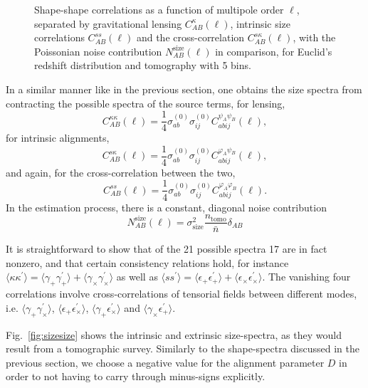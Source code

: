 \documentclass[a4paper,fleqn,usenatbib]{mnras}
\newcommand{\bra}{\langle}
\newcommand{\ket}{\rangle}
\begin{document}
\begin{figure}
\centering
\caption{Shape-shape correlations as a function of multipole order $\ell$, separated by gravitational lensing $C_{AB}^{\kappa}(\ell)$, intrinsic size correlations $C_{AB}^{ss}(\ell)$ and the cross-correlation $C_{AB}^{s\kappa}(\ell)$, with the Poissonian noise contribution $N_{AB}^\mathrm{size}(\ell)$ in comparison, for Euclid's redshift distribution and tomography with 5 bins.}
\label{fig:shapeshape}
\end{figure}

In a similar manner like in the previous section, one obtains the size spectra from contracting the possible spectra of the source terms, for lensing,
\begin{equation}
C^{\kappa\kappa}_{AB}(\ell) = \frac{1}{4}\sigma^{(0)}_{ab}\sigma^{(0)}_{ij}C^{\psi_A\psi_B}_{abij}(\ell),
\end{equation}
for intrinsic alignments,
\begin{equation}
C^{s\kappa}_{AB}(\ell) = \frac{1}{4}\sigma^{(0)}_{ab}\sigma^{(0)}_{ij}C^{\varphi_A\psi_B}_{abij}(\ell),
\end{equation}
and again, for the cross-correlation between the two,
\begin{equation}
C^{ss}_{AB}(\ell) = \frac{1}{4}\sigma^{(0)}_{ab}\sigma^{(0)}_{ij}C^{\varphi_A\varphi_B}_{abij}(\ell).
\end{equation}
In the estimation process, there is a constant, diagonal noise contribution
\begin{equation}
N_{AB}^\mathrm{size}(\ell) = \sigma^2_\mathrm{size} \frac{n_\mathrm{tomo}}{\bar{n}}\delta_{AB}
\end{equation}

It is straightforward to show that of the 21 possible spectra 17 are in fact nonzero, and that certain consistency relations hold, for instance $\bra\kappa\kappa^\prime\ket = \bra\gamma_+\gamma_+^\prime\ket + \bra\gamma_\times\gamma_\times^\prime\ket$ as well as $\bra ss^\prime\ket = \bra\epsilon_+\epsilon_+^\prime\ket + \bra\epsilon_\times\epsilon_\times^\prime\ket$. The vanishing four correlations involve cross-correlations of tensorial fields between different modes, i.e. $\bra\gamma_+\gamma_\times^\prime\ket$, $\bra\epsilon_+\epsilon_\times^\prime\ket$, $\bra\gamma_+\epsilon_\times^\prime\ket$ and $\bra\gamma_\times\epsilon_+^\prime\ket$.

Fig.~\ref{fig:sizesize} shows the intrinsic and extrinsic size-spectra, as they would result from a tomographic survey. Similarly to the shape-spectra discussed in the previous section, we choose a negative value for the alignment parameter $D$ in order to not having to carry through minus-signs explicitly.
\end{document}
